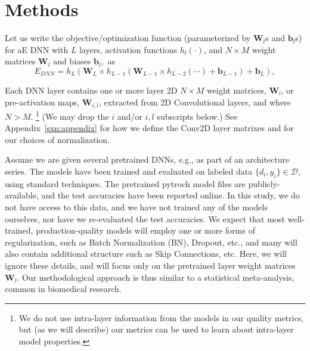 \section{Methods}
\label{sxn:methods}


Let us write the objective/optimization function (parameterized by $\mathbf{W}_{l}$s and $\mathbf{b}_{l}$s) for aE DNN with $L$ layers, activation functions $h_{l}(\cdot)$, and $N\times M$ weight matrices $\mathbf{W}_{l}$ and biases $\mathbf{b}_{l}$,~as 
\begin{equation}
E_{DNN}=h_{L}(\mathbf{W}_{L}\times h_{L-1}(\mathbf{W}_{L-1}\times h_{L-2}(\cdots)+\mathbf{b}_{L-1})+\mathbf{b}_{L}),
\label{eqn:dnn_energy}
\end{equation}

Each DNN layer contains one or more layer 2D  $N\times M$ weight matrices, $\mathbf{W}_{l}$, or pre-activation maps, $\mathbf{W}_{i,l}$, extracted from 2D Convolutional layers, and where $N > M$.%
\footnote{We do not use intra-layer information from the models in our quality metrics, but (as we will describe) our metrics can be used to learn about intra-layer model properties.}
(We may drop the $i$ and/or $i,l$ subscripts below.)
See Appendix~\ref{sxn:appendix} for how we define the Conv2D layer matrixes and for our choices of normalization. 

Assume we are given several pretrained DNNs, e.g., as part of an architecture series.
The models have been trained and evaluated on labeled data $\{d_{i},y_{i}\}\in\mathcal{D}$, using standard techniques.  
The pretrained pytroch model files are publicly-available, and the test accuracies have been reported online.  
In this study, we do not have access to this data, and we have not trained any of the models ourselves,
nor have we re-evaluated the test accuracies.
We expect that most well-trained, production-quality models will employ one or more forms of regularization, such as Batch Normalization (BN), Dropout, etc., and many will also contain additional structure such as Skip Connections, etc. 
Here, we will ignore these details, and will focus only on the pretrained layer weight matrices $\mathbf{W}_{l}$.
Our methodological approach is thus similar to a statistical meta-analysis, common in biomedical research.


